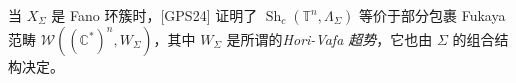 
当 $X_{\Sigma}$ 是 Fano 环簇时，[GPS24] 证明了 $\operatorname{Sh}_c (\mathbb{T}^n,\Lambda_{\Sigma})$ 等价于部分包裹 Fukaya 范畴 $\mathcal{W}\left(\left(\mathbb{C}^{\ast}\right)^n,W_{\Sigma}\right)$，其中 $W_{\Sigma}$ 是所谓的\emph{Hori-Vafa 超势}，它也由 $\Sigma$ 的组合结构决定。
